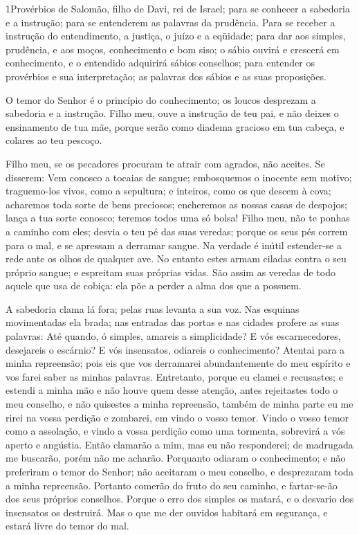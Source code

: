 
\lettrine{1}{}Provérbios de Salomão, filho de Davi, rei de
Israel; para se conhecer a sabedoria e a instrução; para se
entenderem as palavras da prudência. Para se receber a instrução
do entendimento, a justiça, o juízo e a eqüidade; para dar aos
simples, prudência, e aos moços, conhecimento e bom siso; o
sábio ouvirá e crescerá em conhecimento, e o entendido adquirirá
sábios conselhos; para entender os provérbios e sua
interpretação; as palavras dos sábios e as suas proposições.

O temor do Senhor é o princípio do conhecimento; os loucos
desprezam a sabedoria e a instrução. Filho meu, ouve a instrução
de teu pai, e não deixes o ensinamento de tua mãe, porque serão
como diadema gracioso em tua cabeça, e colares ao teu pescoço.

Filho meu, se os pecadores procuram te atrair com agrados, não
aceites. Se disserem: Vem conosco a tocaias de sangue;
embosquemos o inocente sem motivo; traguemo-los vivos, como a
sepultura; e inteiros, como os que descem à cova; acharemos
toda sorte de bens preciosos; encheremos as nossas casas de
despojos; lança a tua sorte conosco; teremos todos uma só
bolsa! Filho meu, não te ponhas a caminho com eles; desvia o
teu pé das suas veredas; porque os seus pés correm para o
mal, e se apressam a derramar sangue. Na verdade é inútil
estender-se a rede ante os olhos de qualquer ave. No entanto
estes armam ciladas contra o seu próprio sangue; e espreitam suas
próprias vidas. São assim as veredas de todo aquele que usa
de cobiça: ela põe a perder a alma dos que a possuem.

A sabedoria clama lá fora; pelas ruas levanta a sua voz.
Nas esquinas movimentadas ela brada; nas entradas das portas
e nas cidades profere as suas palavras: Até quando, ó
simples, amareis a simplicidade? E vós escarnecedores, desejareis o
escárnio? E vós insensatos, odiareis o conhecimento? Atentai
para a minha repreensão; pois eis que vos derramarei abundantemente
do meu espírito e vos farei saber as minhas palavras.
Entretanto, porque eu clamei e recusastes; e estendi a minha
mão e não houve quem desse atenção, antes rejeitastes todo o
meu conselho, e não quisestes a minha repreensão, também de
minha parte eu me rirei na vossa perdição e zombarei, em vindo o
vosso temor. Vindo o vosso temor como a assolação, e vindo a
vossa perdição como uma tormenta, sobrevirá a vós aperto e angústia.
Então clamarão a mim, mas eu não responderei; de madrugada me
buscarão, porém não me acharão. Porquanto odiaram o
conhecimento; e não preferiram o temor do Senhor; não
aceitaram o meu conselho, e desprezaram toda a minha repreensão.
Portanto comerão do fruto do seu caminho, e fartar-se-ão dos
seus próprios conselhos. Porque o erro dos simples os matará,
e o desvario dos insensatos os destruirá. Mas o que me der
ouvidos habitará em segurança, e estará livre do temor do mal.

